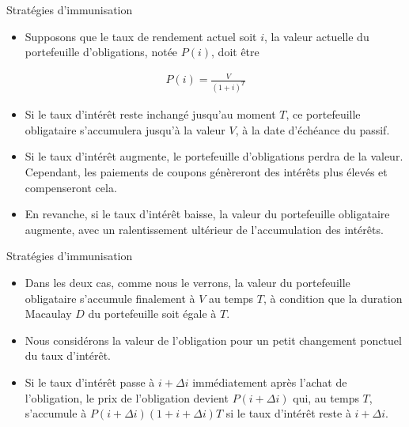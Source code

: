 \documentclass{beamer}
\begin{document}
\begin{frame}{Stratégies d'immunisation}
\begin{itemize}[label=\bullet]
\item Supposons que le taux de rendement actuel soit $i$, la valeur actuelle du portefeuille d'obligations, notée $P(i)$, doit être
\end{itemize}
\begin{align*}
P(i)=\frac{V}{(1+i)^T}
\end{align*}
\begin{itemize}[label=\bullet]
\item Si le taux d'intérêt reste inchangé jusqu'au moment $T$,  ce portefeuille obligataire s'accumulera jusqu'à la valeur $V$, à la date d'échéance du passif.
\item Si le taux d'intérêt augmente, le portefeuille d'obligations perdra de la valeur. Cependant, les paiements de coupons génèreront des intérêts plus élevés et compenseront cela.
\item En revanche, si le taux d'intérêt baisse, la valeur du portefeuille obligataire augmente, avec un ralentissement ultérieur de l'accumulation des intérêts.
\end{itemize}
\end{frame}


\begin{frame}{Stratégies d'immunisation}
\begin{itemize}[label=\bullet]
\item Dans les deux cas, comme nous le verrons, la valeur du portefeuille obligataire s’accumule finalement à $V$ au temps $T$, à condition que la duration Macaulay $D$ du portefeuille soit égale à $T$.
\item Nous considérons la valeur de l'obligation pour un petit changement ponctuel du taux d'intérêt.
\item Si le taux d'intérêt passe à $i + \Delta i$ immédiatement après l'achat de l'obligation, le prix de l'obligation devient $P(i + \Delta i)$ qui, au temps $T$, s'accumule à $P(i + \Delta i) (1 + i + \Delta i) T$ si le taux d'intérêt reste à $i + \Delta i$.
\end{itemize}
\end{frame}
\end{document}
